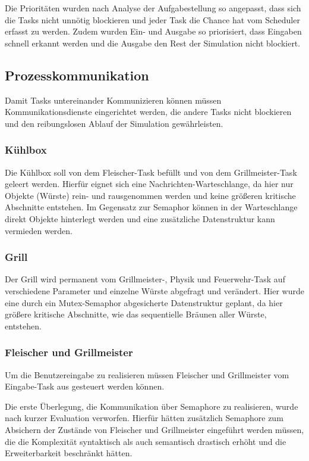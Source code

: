 Die Prioritäten wurden nach Analyse der Aufgabestellung so angepasst, dass sich die Tasks nicht unnötig blockieren und jeder Task die Chance hat vom Scheduler erfasst zu werden.
Zudem wurden Ein- und Ausgabe so priorisiert, dass Eingaben schnell erkannt werden und die Ausgabe den Rest der Simulation nicht blockiert.

\subsection{Prozesskommunikation}

Damit Tasks untereinander Kommunizieren können müssen Kommunikationsdienste eingerichtet werden, die andere Tasks nicht blockieren und den reibungslosen Ablauf der Simulation gewährleisten.

\subsubsection{Kühlbox}

Die Kühlbox soll von dem Fleischer-Task befüllt und von dem Grillmeister-Task geleert werden.
Hierfür eignet sich eine Nachrichten-Warteschlange, da hier nur Objekte (Würste) rein- und rausgenommen werden
und keine größeren kritische Abschnitte entstehen.
Im Gegensatz zur Semaphor können in der Warteschlange direkt Objekte hinterlegt werden und eine zusätzliche Datenstruktur kann vermieden werden.

\subsubsection{Grill}

Der Grill wird permanent vom Grillmeister-, Physik und Feuerwehr-Task auf verschiedene Parameter und einzelne Würste abgefragt und verändert.
Hier wurde eine durch ein Mutex-Semaphor abgesicherte Datenstruktur geplant, da hier größere kritische Abschnitte,
wie das sequentielle Bräunen aller Würste, entstehen.

\subsubsection{Fleischer und Grillmeister}

Um die Benutzereingabe zu realisieren müssen Fleischer und Grillmeister vom Eingabe-Task aus gesteuert werden können.

Die erste Überlegung, die Kommunikation über Semaphore zu realisieren, wurde nach kurzer Evaluation verworfen.
Hierfür hätten zusätzlich Semaphore zum Absichern der Zustände von Fleischer und Grillmeister eingeführt werden müssen,
die die Komplexität syntaktisch als auch semantisch drastisch erhöht und die Erweiterbarkeit beschränkt hätten.

